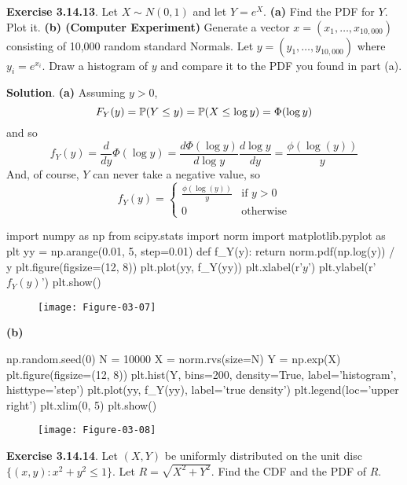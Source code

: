\textbf{Exercise 3.14.13}. Let \(X \sim N(0, 1)\) and let \(Y = e^X\).
\textbf{(a)} Find the PDF for \(Y\). Plot it.
\textbf{(b) (Computer Experiment)} Generate a vector
\(x = (x_{1}, \dots, x_{10,000})\) consisting of 10,000 random standard
Normals. Let \(y = (y_{1}, \dots, y_{10,000})\) where \(y_{i} = e^{x_{i}}\).
Draw a histogram of \(y\) and compare it to the PDF you found in part
(a).

\textbf{Solution}.
\textbf{(a)}
Assuming \(y > 0\),
\[
F_Y(y) = \operatorname{\mathbb{P}}(Y \leq y) = \operatorname{\mathbb{P}}(X \leq \log y) = \Phi(\log y)
\]
and so
\[
f_Y(y) = \frac{d}{dy} \Phi(\log y) = \frac{d \Phi(\log y)}{d \log y} \frac{d \log y}{dy} = \frac{\phi(\log(y))}{y}
\]
And, of course, \(Y\) can never take a negative value, so
\[
f_Y(y) =
\begin{cases}
\frac{\phi(\log(y))}{y} &\text{if } y > 0 
\\[
1ex]
0 &\text{otherwise}
\end{cases}
\]

\begin{python}
import numpy as np
from scipy.stats import norm
import matplotlib.pyplot as plt
yy = np.arange(0.01, 5, step=0.01)
def f_Y(y):
    return norm.pdf(np.log(y)) / y
plt.figure(figsize=(12, 8))
plt.plot(yy, f_Y(yy))
plt.xlabel(r'$y$')
plt.ylabel(r'$f_Y(y)$')
plt.show()
\end{python}

\begin{figure}[H]
\centering
\texttt{[image: Figure-03-07]}
\end{figure}

\textbf{(b)}

\begin{python}
np.random.seed(0)
N = 10000
X = norm.rvs(size=N)
Y = np.exp(X)
plt.figure(figsize=(12, 8))
plt.hist(Y, bins=200, density=True, label='histogram', histtype='step')
plt.plot(yy, f_Y(yy), label='true density')
plt.legend(loc='upper right')
plt.xlim(0, 5)
plt.show()
\end{python}

\begin{figure}[H]
\centering
\texttt{[image: Figure-03-08]}
\end{figure}


\textbf{Exercise 3.14.14}. Let \((X, Y)\) be uniformly distributed on
the unit disc \(\{ (x, y) : x^{2} + y^{2} \leq 1 \}\). Let
\(R = \sqrt{X^{2} + Y^{2}}\). Find the CDF and the PDF of \(R\).

